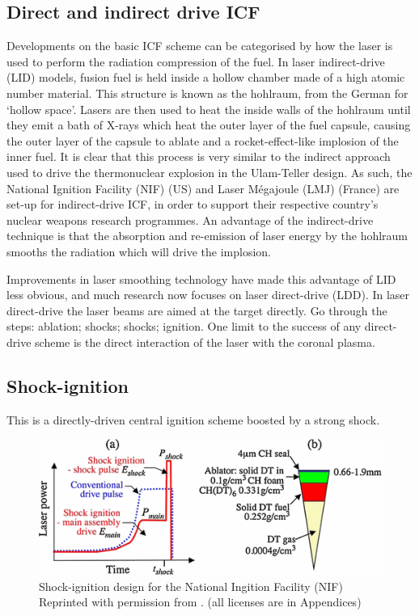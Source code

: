 \subsection{Direct and indirect drive ICF}
Developments on the basic ICF scheme can be categorised by how the laser is used to perform the radiation compression of the fuel. In laser indirect-drive (\acrshort{LID}) models, fusion fuel is held inside a hollow chamber made of a high atomic number material. This structure is known as the hohlraum, from the German for `hollow space'. Lasers are then used to heat the inside walls of the hohlraum until they emit a bath of X-rays which heat the outer layer of the fuel capsule, causing the outer layer of the capsule to ablate and a rocket-effect-like implosion of the inner fuel. It is clear that this process is very similar to the indirect approach used to drive the thermonuclear explosion in the Ulam-Teller design. As such, the National Ignition Facility (\acrshort{NIF}) (US) and Laser M\'{e}gajoule (\acrshort{LMJ}) (France) are set-up for indirect-drive ICF, in order to support their respective country's nuclear weapons research programmes. An advantage of the indirect-drive technique is that the absorption and re-emission of laser energy by the hohlraum smooths the radiation which will drive the implosion.

Improvements in laser smoothing technology have made this advantage of \acrshort{LID} less obvious, and much research now focuses on laser direct-drive (\acrshort{LDD}). In laser direct-drive the laser beams are aimed at the target directly. Go through the steps: ablation; shocks; shocks; ignition. One limit to the success of any direct-drive scheme is the direct interaction of the laser with the coronal plasma. 





\subsection{Shock-ignition}
 This is a directly-driven central ignition scheme boosted by a strong shock.

\begin{figure}
 \centering
 \includegraphics[width=0.8\columnwidth]{Chapters/C1_Introduction/SI_profile.png}
 \caption{Shock-ignition design for the National Ingition Facility (NIF) Reprinted with permission from \citep{Perkins2009}. (all licenses are in Appendices)} \label{fig:SI_laser}
\end{figure}


